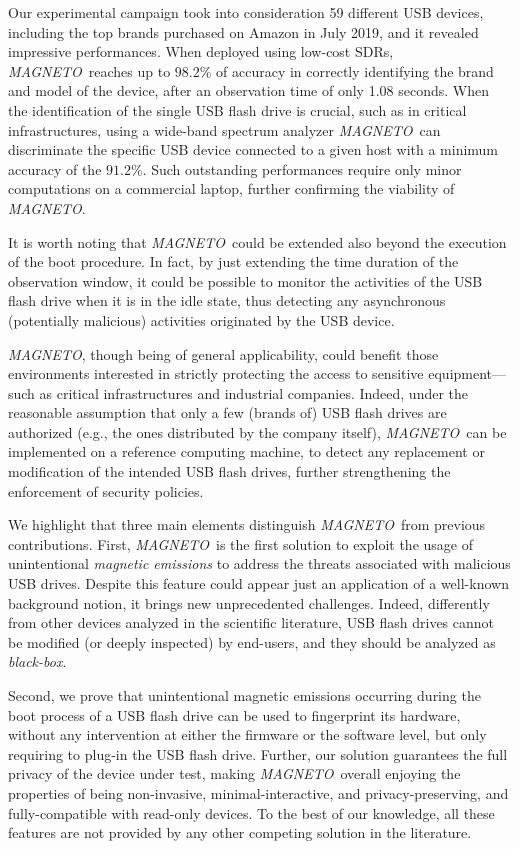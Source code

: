 \documentclass[acmsmall, authorversion]{acmart}
\newcommand{\sol}{\emph{MAGNETO}}
\begin{document}
Our experimental campaign took into consideration 59 different USB devices, including the top brands purchased on Amazon in July 2019, and it revealed impressive performances. When deployed using low-cost \acp{SDR}, \sol\ reaches up to $98.2$\% of accuracy in correctly identifying the brand and model of the device, after an observation time of only 1.08 seconds. When the identification of the single USB flash drive is crucial, such as in critical infrastructures, using a wide-band spectrum analyzer \sol\ can discriminate the specific USB device connected to a given host with a minimum accuracy of the $91.2$\%. Such outstanding performances require only minor computations on a commercial laptop, further confirming the viability of \sol.

It is worth noting that \sol\ could be extended also beyond the execution of the boot procedure. In fact, by just extending the time duration of the observation window, it could be possible to monitor the activities of the USB flash drive when it is in the idle state, thus detecting any asynchronous (potentially malicious) activities originated by the USB device.

\sol, though being of general applicability, could benefit those environments interested in strictly protecting the access to sensitive equipment---such as critical infrastructures and industrial companies. 
Indeed, under the reasonable assumption that only a few (brands of) USB flash drives are authorized (e.g., the ones distributed by the company itself), \sol\ can be implemented on a reference computing machine, to detect any replacement or modification of the intended USB flash drives, further strengthening the enforcement of security policies.

We highlight that three main elements distinguish \sol\ from previous contributions. First, \sol\ is the first solution to exploit the usage of unintentional \emph{magnetic emissions} to address the threats associated with malicious USB drives. Despite this feature could appear just an application of a well-known background notion, it brings new unprecedented challenges. Indeed, differently from other devices analyzed in the scientific literature, USB flash drives cannot be modified (or deeply inspected) by end-users, and they should be analyzed as \emph{black-box}.

Second, we prove that unintentional magnetic emissions occurring during the boot process of a USB flash drive can be used to fingerprint its hardware, without any intervention at either the firmware or the software level, but only requiring to plug-in the USB flash drive. 
Further, our solution guarantees the full privacy of the device under test, making \sol\ overall enjoying the properties of being non-invasive, minimal-interactive, and privacy-preserving, and fully-compatible with read-only devices. To the best of our knowledge, all these features are not provided by any other competing solution in the literature.
\end{document}
